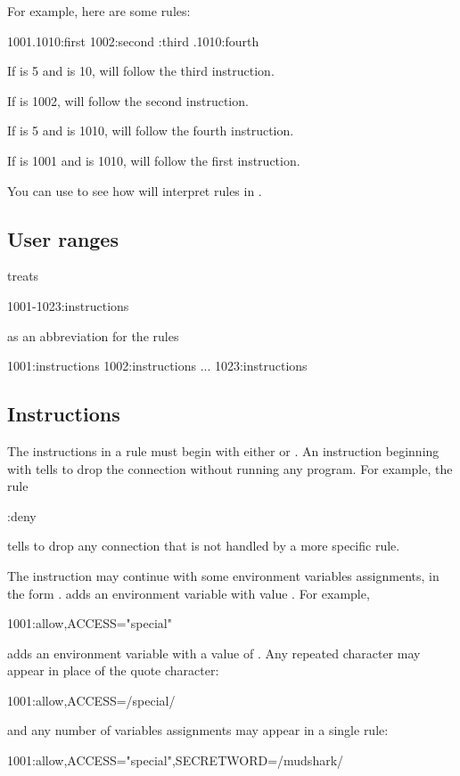\documentclass{book}
\begin{document}
For example, here are some rules:
\begin{code}%
  1001.1010:first
  1002:second
  :third
  .1010:fourth
\end{code}

If  is 5 and  is 10,
 will follow the third instruction.

If  is 1002,  will follow the
second instruction.

If  is 5 and  is 1010,
 will follow the fourth instruction.

If  is 1001 and  is 1010,
 will follow the first instruction.

You can use  to see how  will
interpret rules in .

\subsection{User ranges}
 treats
\begin{code}%
  1001-1023:instructions
\end{code}
as an abbreviation for the rules
\begin{code}%
  1001:instructions
  1002:instructions
  ...
  1023:instructions
\end{code}

\subsection{Instructions}
The instructions in a rule must begin with either  or
.  An instruction beginning with  tells
 to drop the connection without running any program.
For example, the rule
\begin{code}%
  :deny
\end{code}
tells  to drop any connection that is not handled by a
more specific rule.

The instruction may continue with some environment variables
assignments, in the form .   adds an
environment variable  with value .  For example,
\begin{code}%
  1001:allow,ACCESS="special"
\end{code}
adds an environment variable  with a value of
.  Any repeated character may appear in place of the
quote character:
\begin{code}%
  1001:allow,ACCESS=/special/
\end{code}
and any number of variables assignments may appear in a single rule:
\begin{code}%
  1001:allow,ACCESS="special",SECRETWORD=/mudshark/
\end{code}
\end{document}
